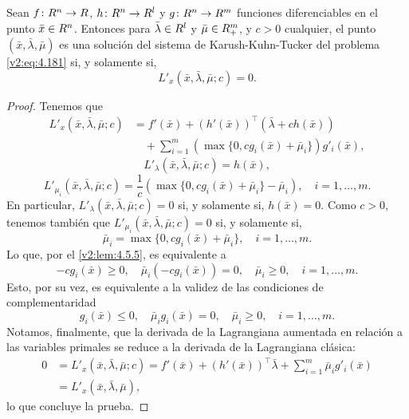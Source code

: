 \begin{theorem}\label{v2:thm:4.5.6}
    Sean $f \colon R^n \to R$, $h \colon R^n \to R^l$ y $g \colon R^n \to R^m$ funciones diferenciables en el punto $\bar{x} \in R^n$.
    Entonces para $\bar{\lambda} \in R^l$ y $\bar{\mu} \in R^m_+$, y $c > 0$ cualquier, el punto $(\bar{x}, \bar{\lambda}, \bar{\mu})$ es una solución del sistema de Karush-Kuhn-Tucker del problema \eqref{v2:eq:4.181} si, y solamente si,
    \[
        L'_x(\bar{x}, \bar{\lambda}, \bar{\mu}; c) = 0.
    \]
\end{theorem}
\begin{proof}
    Tenemos que
    \begin{align*}
        L'_x(\bar{x}, \bar{\lambda}, \bar{\mu}; c) &= f'(\bar{x}) + (h'(\bar{x}))^\top(\bar{\lambda} + c h(\bar{x})) \\
        &\quad + \sum_{i=1}^m (\max\{0, c g_i(\bar{x}) + \bar{\mu}_i\}) g'_i(\bar{x}),
    \end{align*}
    \[
        L'_\lambda(\bar{x}, \bar{\lambda}, \bar{\mu}; c) = h(\bar{x}),
    \]
    \[
        L'_{\mu_i}(\bar{x}, \bar{\lambda}, \bar{\mu}; c) = \frac{1}{c} (\max\{0, c g_i(\bar{x}) + \bar{\mu}_i\} - \bar{\mu}_i), \quad i = 1, \dots, m.
    \]
    En particular, $L'_\lambda(\bar{x}, \bar{\lambda}, \bar{\mu}; c) = 0$ si, y solamente si, $h(\bar{x}) = 0$. Como $c > 0$, tenemos también que $L'_{\mu_i}(\bar{x}, \bar{\lambda}, \bar{\mu}; c) = 0$ si, y solamente si,
    \[
        \bar{\mu}_i = \max\{0, c g_i(\bar{x}) + \bar{\mu}_i\}, \quad i = 1, \dots, m.
    \]
    Lo que, por el \cref{v2:lem:4.5.5}, es equivalente a
    \[
        -cg_i(\bar{x}) \ge 0, \quad \bar{\mu}_i(-cg_i(\bar{x})) = 0, \quad \bar{\mu}_i \ge 0, \quad i = 1, \dots, m.
    \]
    Esto, por su vez, es equivalente a la validez de las condiciones de complementaridad
    \[
        g_i(\bar{x}) \le 0, \quad \bar{\mu}_i g_i(\bar{x}) = 0, \quad \bar{\mu}_i \ge 0, \quad i = 1, \dots, m.
    \]
    Notamos, finalmente, que la derivada de la Lagrangiana aumentada en relación a las variables primales se reduce a la derivada de la Lagrangiana clásica:
    \begin{align*}
        0 &= L'_x(\bar{x}, \bar{\lambda}, \bar{\mu}; c) = f'(\bar{x}) + (h'(\bar{x}))^\top\bar{\lambda} + \sum_{i=1}^m \bar{\mu}_i g'_i(\bar{x}) \\
        &= L'_x(\bar{x}, \bar{\lambda}, \bar{\mu}),
    \end{align*}
    lo que concluye la prueba.
\end{proof}

